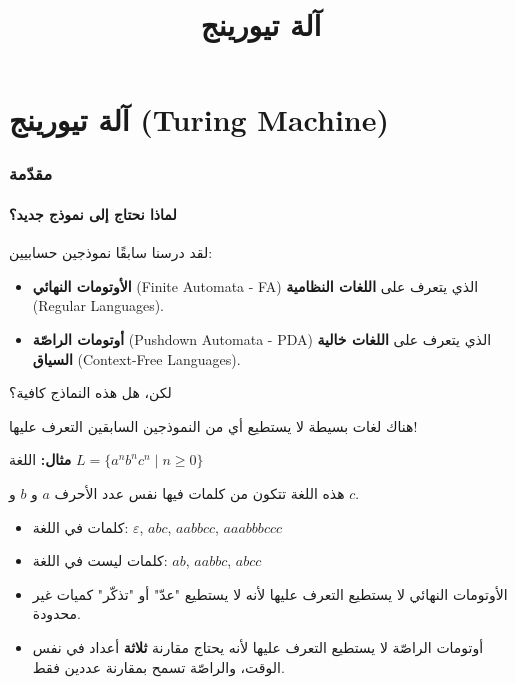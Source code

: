 \documentclass[14pt]{extarticle}
\title{آلة تيورينج}
\begin{document}
\maketitle

\renewcommand{\contentsname}{جدول المحتويات}
\tableofcontents
\clearpage

\part{آلة تيورينج (\textenglish{Turing Machine})}

\section{مقدّمة}

\subsection{لماذا نحتاج إلى نموذج جديد؟}

لقد درسنا سابقًا نموذجين حسابيين:
\begin{itemize}
    \item \textbf{الأوتومات النهائي} (\textenglish{Finite Automata - FA}) الذي يتعرف على \textbf{اللغات النظامية} (\textenglish{Regular Languages}).
    \item \textbf{أوتومات الراصّة} (\textenglish{Pushdown Automata - PDA}) الذي يتعرف على \textbf{اللغات خالية السياق} (\textenglish{Context-Free Languages}).
\end{itemize}

لكن، هل هذه النماذج كافية؟

\begin{boxAttention}
هناك لغات بسيطة لا يستطيع أي من النموذجين السابقين التعرف عليها!
\end{boxAttention}

\textbf{مثال:} اللغة $L = \{a^n b^n c^n \mid n \geq 0\}$

هذه اللغة تتكون من كلمات فيها نفس عدد الأحرف $a$ و $b$ و $c$.
\begin{itemize}
    \item كلمات في اللغة: $\varepsilon$, $abc$, $aabbcc$, $aaabbbccc$
    \item كلمات ليست في اللغة: $ab$, $aabbc$, $abcc$
\end{itemize}

\begin{itemize}
    \item الأوتومات النهائي لا يستطيع التعرف عليها لأنه لا يستطيع "عدّ" أو "تذكّر" كميات غير محدودة.
    \item أوتومات الراصّة لا يستطيع التعرف عليها لأنه يحتاج مقارنة \textbf{ثلاثة} أعداد في نفس الوقت، والراصّة تسمح بمقارنة عددين فقط.
\end{itemize}
\end{document}
